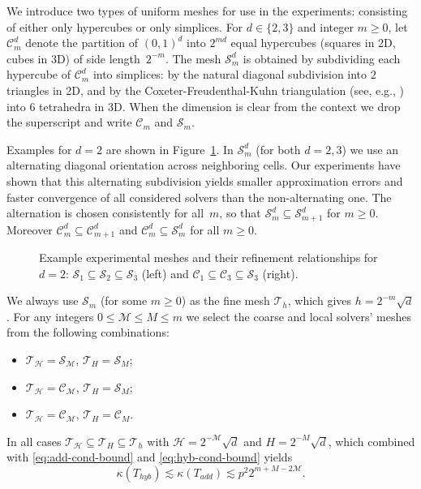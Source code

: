 \documentclass[11pt]{article}
\theoremstyle{definition}
\theoremstyle{theorem}
\begin{document}
We introduce two types of uniform meshes for use in the experiments: consisting
of either only hypercubes or only simplices. For $d\in\{2, 3\}$ and integer $m\geq 0$, let
$\mathcal{C}_m^d$ denote the partition of $(0, 1)^d$ into $2^{md}$ equal hypercubes
(squares in 2D, cubes in 3D) of side length~$2^{-m}$. The mesh $\mathcal{S}_m^d$
is obtained by subdividing each hypercube of $\mathcal{C}_m^d$ into simplices:
by the natural diagonal subdivision into $2$ triangles in 2D, and by the
Coxeter-Freudenthal-Kuhn triangulation (see, e.g., \cite{tetrahedral-subdivision})
into $6$ tetrahedra in 3D. When the dimension is clear from the context we
drop the superscript and write $\mathcal{C}_m$ and $\mathcal{S}_m$.

Examples for $d=2$ are shown in Figure~\ref{fig:mesh_examples}. In $\mathcal{S}_m^d$
(for both $d=2,3$) we use an alternating diagonal orientation across neighboring
cells. Our experiments have shown that this alternating subdivision yields
smaller approximation errors and faster convergence of
all considered solvers than the non-alternating one. The alternation
is chosen consistently for all~$m$, so that
$\mathcal{S}_m^d\subseteq \mathcal{S}_{m+1}^d$ for $m\geq 0$. Moreover
$\mathcal{C}_m^d \subseteq \mathcal{C}_{m + 1}^d$ and $\mathcal{C}_m^d \subseteq \mathcal{S}_m^d$
for all $m\geq 0$.

\begin{figure}
  \centering
  
  \caption{Example experimental meshes and their refinement relationships for $d=2$:
  ${\mathcal{S}_1\subseteq \mathcal{S}_2\subseteq \mathcal{S}_3}$ (left) and
  $\mathcal{C}_1\subseteq \mathcal{C}_3\subseteq \mathcal{S}_3$ (right).}
  \label{fig:mesh_examples}
\end{figure}

We always use $\mathcal{S}_m$ (for some $m\geq 0$) as the fine mesh $\mathcal{T}_h$, which gives
$h=2^{-m}\sqrt{d}$. For any integers $0\leq \mathcal{M}\leq M \leq m$ we select
the coarse and local solvers' meshes from the following combinations:
\begin{itemize}
  \item $\mathcal{T}_\mathcal{H}=\mathcal{S}_\mathcal{M}$, $\mathcal{T}_H=\mathcal{S}_M$;
  \item $\mathcal{T}_\mathcal{H}=\mathcal{C}_\mathcal{M}$, $\mathcal{T}_H=\mathcal{S}_M$;
  \item $\mathcal{T}_\mathcal{H}=\mathcal{C}_\mathcal{M}$, $\mathcal{T}_H=\mathcal{C}_M$.
\end{itemize}
In all cases $\mathcal{T}_\mathcal{H}\subseteq \mathcal{T}_H\subseteq \mathcal{T}_h$ with
$\mathcal{H}=2^{-\mathcal{M}}\sqrt{d}$ and $H=2^{-M}\sqrt{d}$, which combined
with \eqref{eq:add-cond-bound} and \eqref{eq:hyb-cond-bound} yields
\begin{equation}
  \kappa(T_{hyb})\lesssim \kappa(T_{add})\lesssim p^2 2^{m + M - 2\mathcal{M}}.\label{eq:cond-bound-m-M-M}
\end{equation}
\end{document}
